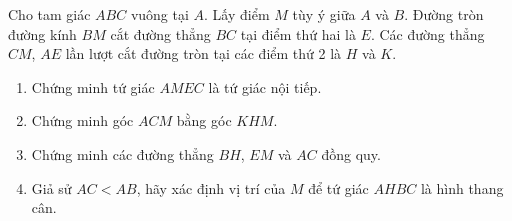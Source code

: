 \begin{ex}%
	Cho tam giác $ABC$ vuông tại $A$. Lấy điểm $M$ tùy ý giữa $A$ và $B$. Đường tròn đường kính $BM$ cắt đường thẳng $BC$ tại điểm thứ hai là $E$. Các đường thẳng $CM$, $AE$ lần lượt cắt đường tròn tại các điểm thứ 2 là $H$ và $K$.
\begin{enumerate}
\item 	Chứng minh tứ giác $AMEC$ là tứ giác nội tiếp.
\item 	Chứng minh góc $ACM$ bằng góc $KHM$.
\item	Chứng minh các đường thẳng $BH$, $EM$ và $AC$ đồng quy.
\item 	Giả sử $AC<AB$, hãy xác định vị trí của $M$ để tứ giác $AHBC$ là hình thang cân. 
\end{enumerate}
\end{ex}
